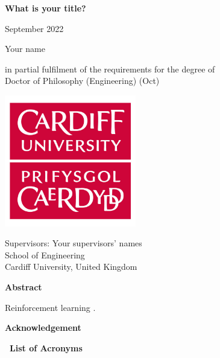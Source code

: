 \documentclass[hidelinks, a4paper, 14pt]{extreport}
\begin{document}
\begin{titlepage}
	\begin{center}
		\bfseries
		{\LARGE What is your title?}

		\vspace{1cm}
		{\large September 2022}
		
		\vspace{0.5cm}
		{\large Your name}

		\vspace{0.5cm}
		in partial fulfilment of the requirements for the degree of\\
		Doctor of Philosophy (Engineering) (Oct)
		
		\vspace{1.5cm}
		\includegraphics[width=0.43\textwidth]{cu-logo.jpg}

		\vspace{1.5cm}
		Supervisors: Your supervisors' names\\
		School of Engineering\\
		Cardiff University, United Kingdom

	\end{center}
\end{titlepage}

\setcounter{page}{1}
\begin{center}
{\LARGE \bf Abstract}
\end{center}

Reinforcement learning \citep{sutton2018reinforcement}.

\newpage
{}
\begin{center}
{\LARGE \bf Acknowledgement}
\end{center}

\tableofcontents

\newpage
{}
{\large \bf \ List of Acronyms}\\ \\
\end{document}
